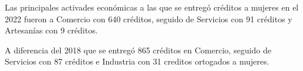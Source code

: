 Las principales activades económicas a las que se entregó créditos a mujeres en el 2022 fueron a Comercio con 640 créditos, seguido de Servicios con 91 créditos y Artesanías con 9 créditos. 

A diferencia del 2018 que se entregó 865 créditos en Comercio, seguido de Servicios con 87 créditos e Industria con 31 creditos ortogados a mujeres. 